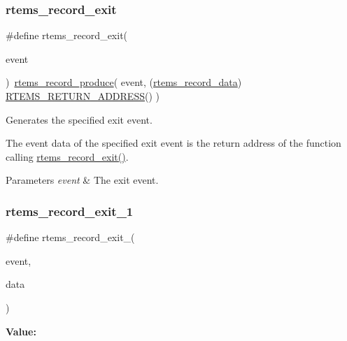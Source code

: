 \subsubsection{\texorpdfstring{rtems\_record\_exit}{rtems\_record\_exit}}
{\footnotesize\ttfamily \#define rtems\+\_\+record\+\_\+exit(\begin{DoxyParamCaption}\item[{}]{event }\end{DoxyParamCaption})~\mbox{\hyperlink{group__RTEMSRecord_ga136d81367324d6729819192181ea68bb}{rtems\+\_\+record\+\_\+produce}}( event, (\mbox{\hyperlink{group__RTEMSRecord_gab483bd3ec735835dac6788b78c817eab}{rtems\+\_\+record\+\_\+data}}) \mbox{\hyperlink{group__RTEMSScoreBaseDefs_ga70a1b8869a1ec49d30613af22ebc3f50}{R\+T\+E\+M\+S\+\_\+\+R\+E\+T\+U\+R\+N\+\_\+\+A\+D\+D\+R\+E\+SS}}() )}



Generates the specified exit event. 

The event data of the specified exit event is the return address of the function calling \mbox{\hyperlink{group__RTEMSRecord_ga84bdc088fc28829caee88f45cb205842}{rtems\+\_\+record\+\_\+exit()}}.


\begin{DoxyParams}{Parameters}
{\em event} & The exit event. \\
\hline
\end{DoxyParams}
\mbox{\label{group__RTEMSRecord_gaabaa22fa377d623f85646e5103cfb396}} 
\subsubsection{\texorpdfstring{rtems\_record\_exit\_1}{rtems\_record\_exit\_1}}
{\footnotesize\ttfamily \#define rtems\+\_\+record\+\_\+exit\+\_(\begin{DoxyParamCaption}\item[{}]{event,  }\item[{}]{data }\end{DoxyParamCaption})}

{\bfseries Value\+:}
\begin{DoxyCode}{0}
\DoxyCodeLine{  )}

\end{DoxyCode}



